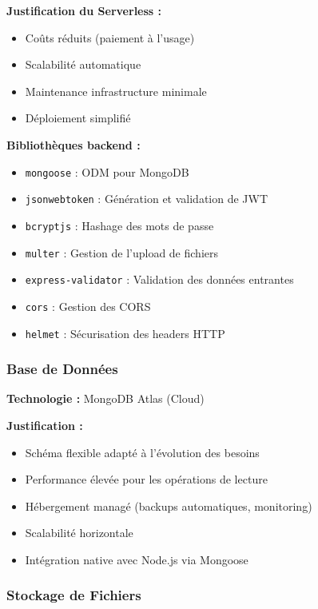 \documentclass[12pt,a4paper]{article}
\begin{document}
\textbf{Justification du Serverless :}
\begin{itemize}[leftmargin=*]
    \item Coûts réduits (paiement à l'usage)
    \item Scalabilité automatique
    \item Maintenance infrastructure minimale
    \item Déploiement simplifié
\end{itemize}

\textbf{Bibliothèques backend :}
\begin{itemize}[leftmargin=*]
    \item \texttt{mongoose} : ODM pour MongoDB
    \item \texttt{jsonwebtoken} : Génération et validation de JWT
    \item \texttt{bcryptjs} : Hashage des mots de passe
    \item \texttt{multer} : Gestion de l'upload de fichiers
    \item \texttt{express-validator} : Validation des données entrantes
    \item \texttt{cors} : Gestion des CORS
    \item \texttt{helmet} : Sécurisation des headers HTTP
\end{itemize}

\subsubsection{Base de Données}

\textbf{Technologie :} MongoDB Atlas (Cloud)

\textbf{Justification :}
\begin{itemize}[leftmargin=*]
    \item Schéma flexible adapté à l'évolution des besoins
    \item Performance élevée pour les opérations de lecture
    \item Hébergement managé (backups automatiques, monitoring)
    \item Scalabilité horizontale
    \item Intégration native avec Node.js via Mongoose
\end{itemize}

\subsubsection{Stockage de Fichiers}
\end{document}
